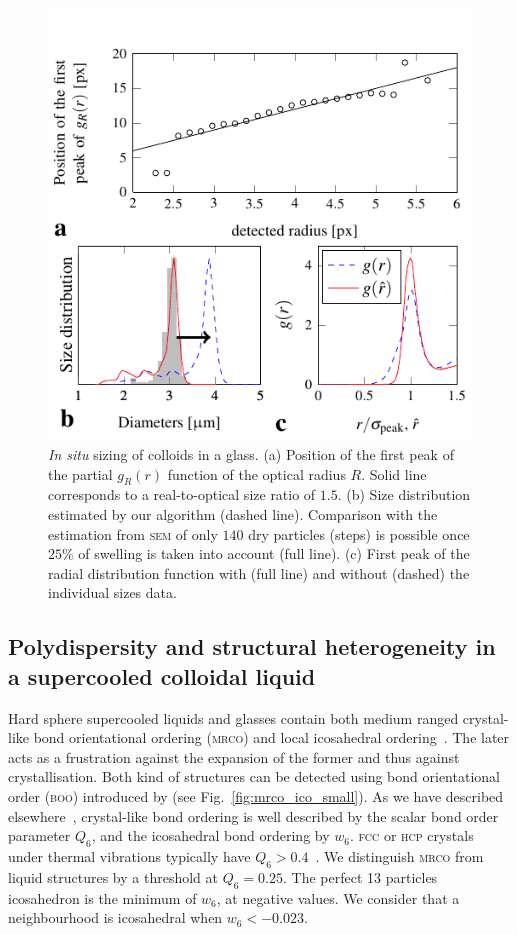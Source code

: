 \documentclass[8.5pt,twoside,twocolumn]{article}
\begin{document}
\begin{figure}[h]
\centering
\includegraphics{fig_sizing.pdf}
	\caption{\emph{In situ} sizing of colloids in a glass. (a) Position of the first peak of the partial $g_R(r)$ function of the optical radius $R$. Solid line corresponds to a real-to-optical size ratio of $1.5$. (b) Size distribution estimated by our algorithm (dashed line). Comparison with the estimation from \textsc{sem} of only $140$ dry particles (steps) is possible once $25\%$ of swelling is taken into account (full line). (c) First peak of the radial distribution function with (full line) and without (dashed) the individual sizes data.}
	\label{fig:sizing}
\end{figure}

\subsection{Polydispersity and structural heterogeneity in a supercooled colloidal liquid}


Hard sphere supercooled liquids and glasses contain both medium ranged crystal-like bond orientational ordering (\textsc{mrco}) and local icosahedral ordering~\cite{Leocmach2012}. The later acts as a frustration against the expansion of the former and thus against crystallisation. Both kind of structures can be detected using bond orientational order (\textsc{boo}) introduced by \citet{steinhardt1983boo} (see Fig.~\ref{fig:mrco_ico_small}). As we have described elsewhere~\cite{Leocmach2012}, crystal-like bond ordering is well described by the scalar bond order parameter $Q_6$, and the icosahedral bond ordering by $w_6$. \textsc{fcc} or \textsc{hcp} crystals under thermal vibrations typically have $Q_6>0.4$~\cite{Lechner2008}. We distinguish \textsc{mrco} from liquid structures by a threshold at $Q_6=0.25$. The perfect 13 particles icosahedron is the minimum of $w_6$, at negative values. We consider that a neighbourhood is icosahedral when $w_6<-0.023$.
\end{document}
